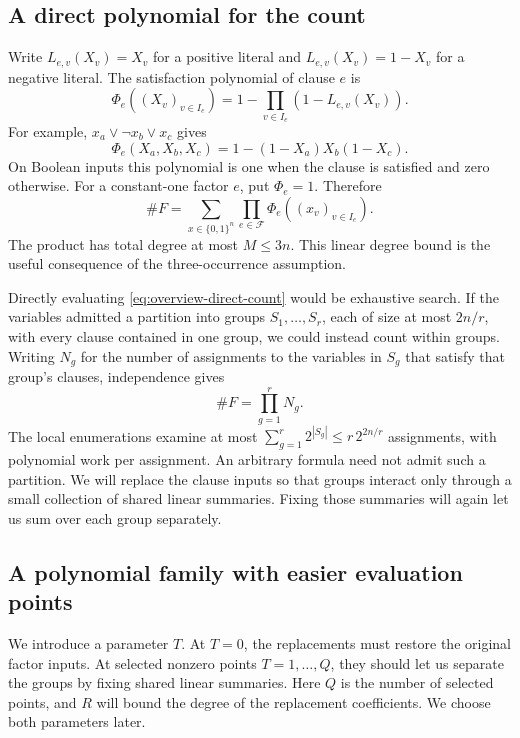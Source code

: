 \subsection{A direct polynomial for the count}\label{subsec:preview-encoding}
Write $L_{e,v}(X_v)=X_v$ for a positive literal and
$L_{e,v}(X_v)=1-X_v$ for a negative literal. The satisfaction
polynomial of clause $e$ is
\[
 \Phi_e((X_v)_{v\in I_e})
 =1-\prod_{v\in I_e}(1-L_{e,v}(X_v)).
\]
For example, $x_a\vee\neg x_b\vee x_c$ gives
\[
 \Phi_e(X_a,X_b,X_c)=1-(1-X_a)X_b(1-X_c).
\]
On Boolean inputs this polynomial is one when the clause is
satisfied and zero otherwise. For a constant-one factor $e$, put
$\Phi_e=1$. Therefore
\begin{equation}\label{eq:overview-direct-count}
 \#F=\sum_{x\in\{0,1\}^n}\prod_{e\in\mathcal F}
                   \Phi_e((x_v)_{v\in I_e}).
\end{equation}
The product has total degree at most $M\le3n$.
This linear degree bound is the useful consequence of the
three-occurrence assumption.

Directly evaluating \eqref{eq:overview-direct-count} would be
exhaustive search. If the variables admitted a partition into groups
$S_1,\ldots,S_r$, each of size at most $2n/r$, with every clause
contained in one group, we could instead count within groups.
Writing $N_g$ for the number of assignments to the variables in $S_g$
that satisfy that group's clauses, independence gives
\[
 \#F=\prod_{g=1}^r N_g.
\]
The local enumerations examine at most
$\sum_{g=1}^r2^{|S_g|}\le r\,2^{2n/r}$ assignments,
with polynomial work per assignment.
An arbitrary formula need not admit such a partition. We will replace
the clause inputs so that groups interact only through a small
collection of shared linear summaries. Fixing those summaries will
again let us sum over each group separately.

\subsection{A polynomial family with easier evaluation points}
\label{subsec:preview-deformation}
We introduce a parameter $T$. At $T=0$, the replacements must
restore the original factor inputs. At selected nonzero points
$T=1,\ldots,Q$, they should let us separate the groups by fixing
shared linear summaries. Here $Q$ is the number of selected points,
and $R$ will bound the degree of the replacement coefficients.
We choose both parameters later.

